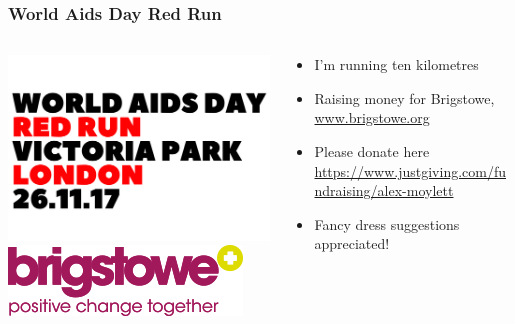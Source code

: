 \documentclass[]{beamer}
\begin{document}
\begin{frame}
\frametitle{World Aids Day Red Run}

  \begin{columns}[T]
    \begin{column}{.5\textwidth}
    \begin{center}
    \includegraphics[scale=0.4]{RR-logo}\\
    \includegraphics[scale=0.7]{brigstowe}
    \end{center}
    \end{column}
    \begin{column}{.5\textwidth}
    \begin{itemize}
    \item I'm running ten kilometres
    
    \item Raising money for Brigstowe, \url{www.brigstowe.org}
    
    \item Please donate here \url{https://www.justgiving.com/fundraising/alex-moylett}
    
    \item Fancy dress suggestions appreciated!
    \end{itemize}
    \end{column}
  \end{columns}

\end{frame}
\end{document}
